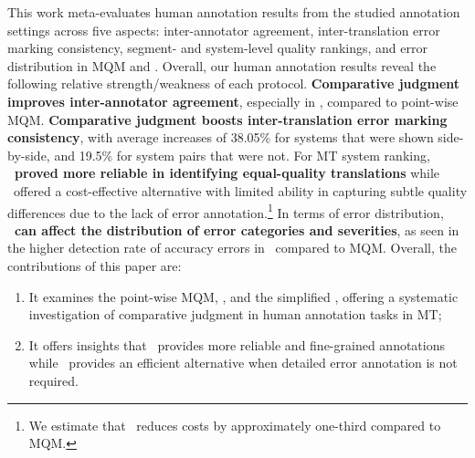 This work meta-evaluates human annotation results from the studied annotation settings across five aspects: inter-annotator agreement, inter-translation error marking consistency, segment- and system-level quality rankings, and error distribution in MQM and \sxsmqm. Overall, our human annotation results reveal the following relative strength/weakness of each protocol. \textbf{Comparative judgment improves inter-annotator agreement}, especially in \sxsmqm, compared to point-wise MQM. \textbf{Comparative judgment boosts inter-translation error marking consistency}, with average increases of 38.05\% for systems that were shown side-by-side, and 19.5\% for system pairs that were not. For MT system ranking, \textbf{\sxsmqm~proved more reliable in identifying equal-quality translations} while \sxsqr~offered a cost-effective alternative 
with limited ability in capturing subtle quality differences due to the lack of error annotation.\footnote{We estimate that \sxsqr~reduces costs by approximately one-third compared to MQM.}
In terms of error distribution, \textbf{\sxsmqm~can affect the distribution of error categories and severities}, as seen in the higher detection rate of accuracy errors in \ZhEn~compared to MQM. Overall, the contributions of this paper are:



\vspace{-3pt}
\begin{enumerate}[label=(\arabic*), itemsep=-0.2em]
    \item It examines the  point-wise MQM, \sxsmqm, and the simplified \sxsqr, offering a systematic investigation of comparative judgment in human annotation tasks in MT;
    
    \item It offers insights that \sxsmqm~provides more reliable and fine-grained annotations while \sxsqr~provides an efficient alternative when detailed error annotation is not required.
\end{enumerate}
\vspace{-6pt}

